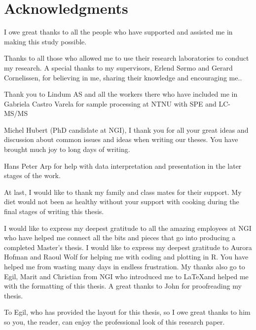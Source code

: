 \newpage
{}
\section*{Acknowledgments}
I owe great thanks to all the people who have supported and assisted me in making this study possible. 

Thanks to all those who allowed me to use their research laboratories to conduct my research. A special thanks to my supervisors, Erlend Sørmo and Gerard Cornelissen, for believing in me, sharing their knowledge and encouraging me.. 


Thank you to Lindum AS and all the workers there  who have included me in 
Gabriela Castro Varela for sample processing at NTNU with SPE and LC-MS/MS

Michel Hubert (PhD candidate at NGI), I thank you for all your great ideas and discussion about common issues and ideas when writing our theses. You have brought much joy to long days of writing. 

Hans Peter Arp for help with data interpretation and presentation in the later stages of the work. 

At last, I would like to thank my family and class mates for their support. My diet would not been as healthy without your support with cooking during the final stages of writing this thesis. 

I would like to express my deepest gratitude to all the amazing employees at NGI who have helped me connect all the bits and pieces that go into producing a completed Master's thesis. 
I would like to express my deepest gratitude to Aurora Hofman and Raoul Wolf for helping me with coding and plotting in R. You have helped me from wasting many days in  endless frustration. My thanks also go to Egil, Marit and Christian from NGI who introduced me to \LaTeX and helped me with the formatting of this thesis. A great thanks to John for proofreading my thesis. 

To Egil, who has provided the layout for this thesis, so I owe great thanks to him so you, the reader, can enjoy the professional look of this research paper. 